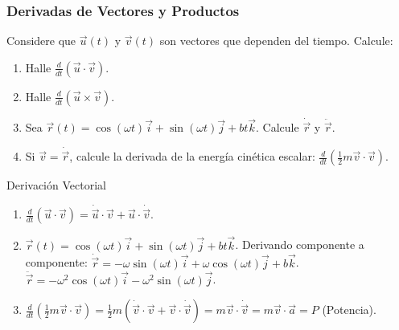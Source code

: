 \subsubsection{Derivadas de Vectores y Productos}
Considere que $\vec{u}(t)$ y $\vec{v}(t)$ son vectores que dependen del tiempo. Calcule:

\begin{enumerate}
    \item Halle $\frac{d}{dt} (\vec{u} \cdot \vec{v})$.
    \item Halle $\frac{d}{dt} (\vec{u} \times \vec{v})$.
    \item Sea $\vec{r}(t) = \cos(\omega t)\vec{i} + \sin(\omega t)\vec{j} + bt\vec{k}$. Calcule $\dot{\vec{r}}$ y $\ddot{\vec{r}}$.
    \item Si $\vec{v} = \dot{\vec{r}}$, calcule la derivada de la energía cinética escalar: $\frac{d}{dt} (\frac{1}{2} m \vec{v} \cdot \vec{v})$.
\end{enumerate}
\begin{solucion}{Derivación Vectorial}
\begin{enumerate}
    \item $\frac{d}{dt} (\vec{u} \cdot \vec{v}) = \dot{\vec{u}} \cdot \vec{v} + \vec{u} \cdot \dot{\vec{v}}$.
    \item $\vec{r}(t) = \cos(\omega t)\vec{i} + \sin(\omega t)\vec{j} + bt\vec{k}$. 
    Derivando componente a componente:
    $\dot{\vec{r}} = -\omega\sin(\omega t)\vec{i} + \omega\cos(\omega t)\vec{j} + b\vec{k}$.
    $\ddot{\vec{r}} = -\omega^2\cos(\omega t)\vec{i} - \omega^2\sin(\omega t)\vec{j}$.
    \item $\frac{d}{dt} (\frac{1}{2} m \vec{v} \cdot \vec{v}) = \frac{1}{2} m (\dot{\vec{v}} \cdot \vec{v} + \vec{v} \cdot \dot{\vec{v}}) = m \vec{v} \cdot \dot{\vec{v}} = m \vec{v} \cdot \vec{a} = P$ (Potencia).
\end{enumerate}
\end{solucion}
